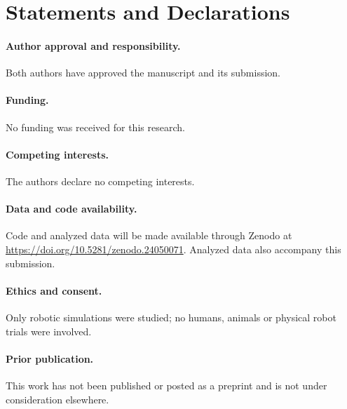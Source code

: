 \section*{Statements and Declarations}
\paragraph{Author approval and responsibility.}
Both authors have approved the manuscript and its submission.
\paragraph{Funding.}
No funding was received for this research.
\paragraph{Competing interests.}
The authors declare no competing interests.
\paragraph{Data and code availability.}
Code and analyzed data will be made available through Zenodo at \url{https://doi.org/10.5281/zenodo.24050071}. Analyzed data also accompany this submission.
\paragraph{Ethics and consent.}
Only robotic simulations were studied; no humans, animals or physical robot trials were involved.
\paragraph{Prior publication.}
This work has not been published or posted as a preprint and is not under consideration elsewhere.

